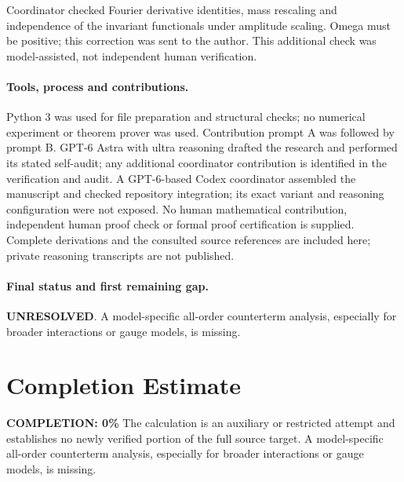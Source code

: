 \documentclass[11pt]{article}
\begin{document}
Coordinator checked Fourier derivative identities, mass rescaling and independence of the invariant functionals under amplitude scaling. Omega must be positive; this correction was sent to the author. This additional check was model-assisted, not independent human verification.

\paragraph{Tools, process and contributions.}
Python 3 was used for file preparation and structural checks; no numerical experiment or theorem prover was used. Contribution prompt A was followed by prompt B. GPT-6 Astra with ultra reasoning drafted the research and performed its stated self-audit; any additional coordinator contribution is identified in the verification and audit. A GPT-6-based Codex coordinator assembled the manuscript and checked repository integration; its exact variant and reasoning configuration were not exposed. No human mathematical contribution, independent human proof check or formal proof certification is supplied. Complete derivations and the consulted source references are included here; private reasoning transcripts are not published.

\paragraph{Final status and first remaining gap.}
\textbf{UNRESOLVED}. A model-specific all-order counterterm analysis, especially for broader interactions or gauge models, is missing.

\section{Completion Estimate}
\noindent\textbf{COMPLETION: 0\%}
The calculation is an auxiliary or restricted attempt and establishes no newly verified portion of the full source target. A model-specific all-order counterterm analysis, especially for broader interactions or gauge models, is missing.
\end{document}

